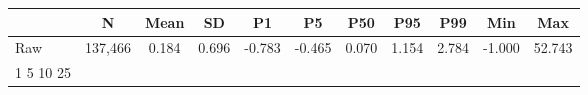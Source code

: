{
\def\sym#1{\ifmmode^{#1}\else\(^{#1}\)\fi}
\begin{tabular}{l*{1}{cccccccccc}}
\toprule
                    &           N&        Mean&          SD&          P1&          P5&         P50&         P95&         P99&         Min&         Max\\
\midrule
Raw                 &     137,466&       0.184&       0.696&      -0.783&      -0.465&       0.070&       1.154&       2.784&      -1.000&      52.743\\
1%
5%
10%
25%
\bottomrule
\end{tabular}
}
